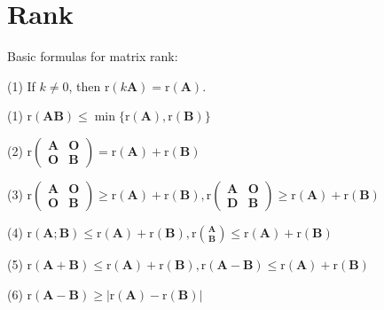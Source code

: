 \documentclass[12pt, a4paper, oneside]{book}
\begin{document}
\section{Rank}
\begin{theorem}
    Basic formulas for matrix rank:

    (1) If $k \neq 0$, then $\mathrm{r}(k \mathbf{A})=\mathrm{r}(\mathbf{A})$.

    (1) $\mathrm{r}(\mathbf{A} \mathbf{B}) \leq \min \{\mathrm{r}(\mathbf{A}), \mathrm{r}(\mathbf{B})\}$

    (2) $\mathrm{r}
        \left(
        \begin{matrix}
                \mathbf{A} & \mathbf{O} \\ \mathbf{O} & \mathbf{B}
            \end{matrix}
        \right)
        =
        \mathrm{r}(\mathbf{A})+\mathrm{r}(\mathbf{B})$

    (3) $\mathrm{r}\left(
        \begin{matrix}
                \mathbf{A} & \mathbf{O} \\ \mathbf{O} & \mathbf{B}
            \end{matrix}
        \right)
        \geq \mathrm{r}(\mathbf{A})+\mathrm{r}(\mathbf{B})
        ,
        \mathrm{r}
        \left(
        \begin{matrix}\mathbf{A} & \mathbf{O} \\ \mathbf{D} & \mathbf{B}
            \end{matrix}
        \right)
        \geq
        \mathrm{r}(\mathbf{A})+\mathrm{r}(\mathbf{B})$

    (4) $\mathrm{r}(\mathbf{A} ; \mathbf{B}) \leq \mathrm{r}(\mathbf{A})+\mathrm{r}(\mathbf{B}), \mathrm{r}\binom{\mathbf{A}}{\mathbf{B}} \leq \mathrm{r}(\mathbf{A})+\mathrm{r}(\mathbf{B})$

    (5) $\mathrm{r}(\mathbf{A}+\mathbf{B}) \leq \mathrm{r}(\mathbf{A})+\mathrm{r}(\mathbf{B}), \mathrm{r}(\mathbf{A}-\mathbf{B}) \leq \mathrm{r}(\mathbf{A})+\mathrm{r}(\mathbf{B})$

    (6) $\mathrm{r}(\mathbf{A}-\mathbf{B}) \geq|\mathrm{r}(\mathbf{A})-\mathrm{r}(\mathbf{B})|$
\end{theorem}
\end{document}
